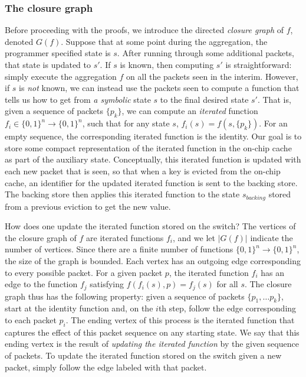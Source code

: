 
\subsubsection{The closure graph}
\label{ss:closure}

Before proceeding with the proofs, we introduce the directed \emph{closure graph} of $f$, denoted $G(f)$. Suppose that at some point during the aggregation, 
the programmer specified state is $s$. After running through some additional packets, that state is updated to $s'$. If $s$ is known, then computing
$s'$ is straightforward: simply execute the aggregation $f$ on all the packets seen in the interim. However, if $s$ is \emph{not} known, we can instead
use the packets seen to compute a function that tells us how to get from \emph{a symbolic} state $s$ to the final desired state $s'$. That is, given a sequence of packets $\{p_k\}$,
we can compute an \emph{iterated} function $f_i \in \{0,1\}^n \rightarrow \{0,1\}^n$, such that for any state $s$, $f_i(s) = f(s, \{p_k\})$. For an empty sequence, the corresponding iterated function is the identity.
Our goal is to store some compact representation of the iterated function in the on-chip cache as part of the auxiliary state. Conceptually,  this iterated function is updated with each new packet that is seen, so that when a key is evicted from the on-chip cache,
an identifier for the updated iterated function is sent to the backing store. The backing store then applies this iterated function to the state $s_{backing}$ stored from a previous eviction to get the new value.

How does one update the iterated function stored on the switch? The vertices of the closure graph of $f$ are iterated functions $f_i$, and we let $|G(f)|$ indicate the number of vertices. Since there are a finite number of functions $\{0, 1\}^n \rightarrow \{0, 1\}^n$, the size of the graph is bounded.
Each vertex has an outgoing edge corresponding to every possible packet. For a given packet $p$, the iterated function $f_i$ has an edge to the function $f_j$ satisfying $f(f_i(s), p) = f_j(s)$ for all $s$.
The closure graph thus has the following property: given a sequence of packets $\{p_1, \ldots p_k\}$, start at the identity function and, on the $i$th step, follow the edge corresponding to each packet $p_i$. The ending vertex of this process is the iterated function that captures the effect of this packet sequence on any starting state. We say that this ending vertex is the result of \emph{updating the iterated function} by the given sequence of packets. To update the iterated function stored on the switch given a new packet, simply follow the edge labeled with that packet.

